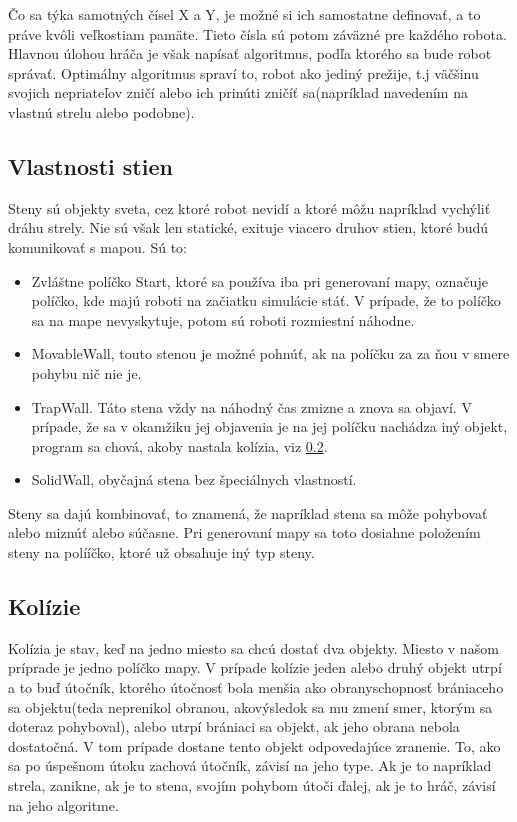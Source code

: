 Čo sa týka samotných čísel X a Y, je možné si ich samostatne definovať, a to práve kvôli veľkostiam pamäte. Tieto čísla sú potom záväzné pre každého robota.
\\Hlavnou úlohou hráča je však napísať algoritmus, podľa ktorého sa bude robot správať. Optimálny algoritmus spraví to, robot ako jediný prežije, t.j väčšinu svojich nepriateľov zničí alebo ich prinúti zničíť sa(napríklad navedením na vlastnú strelu alebo podobne).

\subsection{Vlastnosti stien} %
Steny sú objekty sveta, cez ktoré robot nevidí a ktoré môžu napríklad vychýliť dráhu strely. Nie sú však len statické, exituje viacero druhov stien, ktoré budú komunikovať s mapou. Sú to:\\
\begin{itemize}
\item Zvláštne políčko Start, ktoré sa používa iba pri generovaní mapy, označuje políčko, kde majú roboti na začiatku simulácie stáť. V prípade, že to políčko sa na mape nevyskytuje, potom sú roboti rozmiestní náhodne.
\item MovableWall, touto stenou je možné pohnúť, ak na políčku za za ňou v smere pohybu nič nie je.
\item TrapWall. Táto stena vždy na náhodný čas zmizne a znova sa objaví. V prípade, že sa v okamžiku jej objavenia je na jej políčku nachádza iný objekt, program sa chová, akoby nastala kolízia, viz \ref{kolizie}.
\item SolidWall, obyčajná stena bez špeciálnych vlastností.
\end {itemize}
Steny sa dajú kombinovať, to znamená, že napríklad stena sa môže pohybovať alebo miznúť alebo súčasne. Pri generovaní mapy sa toto dosiahne položením steny na polííčko, ktoré už obsahuje iný typ steny.

\subsection{Kolízie}\label{kolizie}
Kolízia je stav, keď na jedno miesto sa chcú dostať dva objekty. Miesto v našom príprade je jedno políčko mapy. V prípade kolízie jeden alebo druhý objekt utrpí a to buď útočník, ktorého útočnosť bola menšia ako obranyschopnosť brániaceho sa objektu(teda neprenikol obranou, akovýsledok sa mu zmení smer, ktorým sa doteraz pohyboval), alebo utrpí brániaci sa objekt, ak jeho obrana nebola dostatočná. V tom prípade dostane tento objekt odpovedajúce zranenie. To, ako sa po úspešnom útoku zachová útočník, závisí na jeho type. Ak je to napríklad strela, zanikne, ak je to stena, svojím pohybom útoči ďalej, ak je to hráč, závisí na jeho algoritme.
